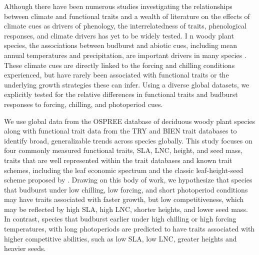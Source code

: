 \documentclass{article}\usepackage[]{graphicx}\usepackage[]{color}
\begin{document}
Although there have been numerous studies investigating the relationships between climate and functional traits and a wealth of literature on the effects of climate cues as drivers of phenology, the interrelatedness of traits, phenological responses, and climate drivers has yet to be widely tested. 
I
n woody plant species, the associations between budburst and abiotic cues, including mean annual temperatures and precipitation, are important drivers in many species \citep{citation}. These climate cues are directly linked to the forcing and chilling conditions experienced, but have rarely been associated with functional traits or the underlying growth strategies these can infer.  Using a diverse global datasets, we explicitly tested for the relative differences in functional traits and budburst responses to forcing, chilling, and photoperiod cues.  

We use global data from the OSPREE database of deciduous woody plant species along with functional trait data from the TRY and BIEN trait databases to identify broad, generalizable trends across species globally. This study focuses on four commonly measured functional traits, SLA, LNC, height, and seed mass, traits that are well represented within the trait databases and known trait schemes, including the leaf economic spectrum \citep{Wright2004} and the classic leaf-height-seed scheme proposed by \cite{Westoby1998}. Drawing on this body of work, we hypothesize that species that budburst under low chilling, low forcing, and short photoperiod conditions may have traits associated with faster growth, but low competitiveness, which may be reflected by high SLA, high LNC, shorter heights, and lower seed mass. In contrast, species that budburst earlier under high chilling or high forcing temperatures, with long photoperiods are predicted to have traits associated with higher competitive abilities, such as low SLA, low LNC, greater heights and heavier seeds. 

\pagebreak
% 

\end{document}
